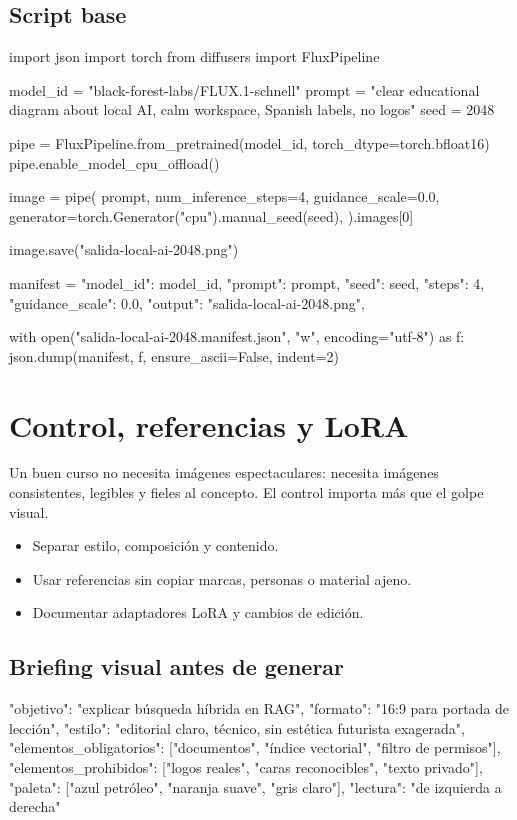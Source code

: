 \documentclass[11pt,a4paper]{book}
\begin{document}
\section{Script base}
\begin{codebox}
import json
import torch
from diffusers import FluxPipeline

model_id = "black-forest-labs/FLUX.1-schnell"
prompt = "clear educational diagram about local AI, calm workspace, Spanish labels, no logos"
seed = 2048

pipe = FluxPipeline.from_pretrained(model_id, torch_dtype=torch.bfloat16)
pipe.enable_model_cpu_offload()

image = pipe(
    prompt,
    num_inference_steps=4,
    guidance_scale=0.0,
    generator=torch.Generator("cpu").manual_seed(seed),
).images[0]

image.save("salida-local-ai-2048.png")

manifest = {
    "model_id": model_id,
    "prompt": prompt,
    "seed": seed,
    "steps": 4,
    "guidance_scale": 0.0,
    "output": "salida-local-ai-2048.png",
}

with open("salida-local-ai-2048.manifest.json", "w", encoding="utf-8") as f:
    json.dump(manifest, f, ensure_ascii=False, indent=2)
\end{codebox}
\chapter{Control, referencias y LoRA}
Un buen curso no necesita imágenes espectaculares: necesita imágenes consistentes, legibles y fieles al concepto. El control importa más que el golpe visual.

\begin{itemize}\item Separar estilo, composición y contenido.\end{itemize}
\begin{itemize}\item Usar referencias sin copiar marcas, personas o material ajeno.\end{itemize}
\begin{itemize}\item Documentar adaptadores LoRA y cambios de edición.\end{itemize}
\section{Briefing visual antes de generar}
\begin{codebox}
{
  "objetivo": "explicar búsqueda híbrida en RAG",
  "formato": "16:9 para portada de lección",
  "estilo": "editorial claro, técnico, sin estética futurista exagerada",
  "elementos_obligatorios": ["documentos", "índice vectorial", "filtro de permisos"],
  "elementos_prohibidos": ["logos reales", "caras reconocibles", "texto privado"],
  "paleta": ["azul petróleo", "naranja suave", "gris claro"],
  "lectura": "de izquierda a derecha"
}
\end{codebox}
\end{document}
